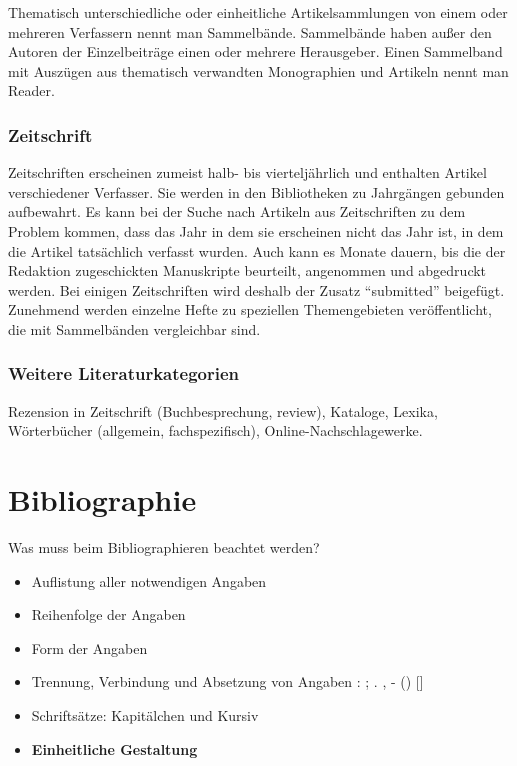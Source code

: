 \documentclass[ 12pt,
                titlepage,
                parskip=half,
                version=first,
                bibliography=totocnumbered,
                final,
                listof=totoc]{scrartcl}
\begin{document}
Thematisch unterschiedliche oder einheitliche Artikelsammlungen von einem oder
mehreren Verfassern nennt man Sammelbände. Sammelbände haben außer den Autoren
der Einzelbeiträge einen oder mehrere Herausgeber. Einen Sammelband mit Auszügen
aus thematisch verwandten Monographien und Artikeln nennt man Reader.

\subsubsection*{Zeitschrift}

Zeitschriften erscheinen zumeist halb- bis vierteljährlich und enthalten Artikel
verschiedener Verfasser. Sie werden in den Bibliotheken zu Jahrgängen gebunden
aufbewahrt. Es kann bei der Suche nach Artikeln aus Zeitschriften zu dem Problem
kommen, dass das Jahr in dem sie erscheinen nicht das Jahr ist, in dem die
Artikel tatsächlich verfasst wurden. Auch kann es Monate dauern, bis die der
Redaktion zugeschickten Manuskripte beurteilt, angenommen und abgedruckt werden.
Bei einigen Zeitschriften wird deshalb der Zusatz \enquote{submitted} beigefügt.
Zunehmend werden einzelne Hefte zu speziellen Themengebieten veröffentlicht, die
mit Sammelbänden vergleichbar sind.

\subsubsection*{Weitere Literaturkategorien}

Rezension in Zeitschrift (Buchbesprechung, review), Kataloge, Lexika,
Wörterbücher (allgemein, fachspezifisch), Online-Nachschlagewerke.

\section{Bibliographie}
\label{sec:bibliographie}

\begin{description}
    \item[Was muss beim Bibliographieren beachtet werden?]
\end{description}
\begin{itemize}
    \item Auflistung aller notwendigen Angaben
    \item Reihenfolge der Angaben
    \item Form der Angaben
    \item Trennung, Verbindung und Absetzung von Angaben : ; . , - () []
    \item Schriftsätze: Kapitälchen und Kursiv
    \item \textbf{Einheitliche Gestaltung}
\end{itemize}
\end{document}
